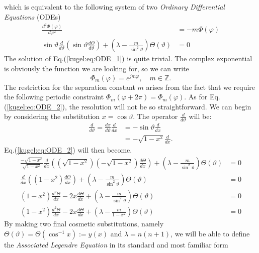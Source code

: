 which is equivalent to the following system of two \emph{Ordinary Differential Equations} (ODEs)
\begin{align}
    \frac{d^2\Phi(\varphi)}{d\varphi^2} &= -m \Phi(\varphi) \label{kugel:eq:ODE_1} \\ 
    \sin \vartheta \frac{d}{d \vartheta} \left( \sin \vartheta \frac{d \Theta}{d \vartheta} \right) + \left( \lambda - \frac{m}{\sin^2 \vartheta} \right)\Theta(\vartheta) &= 0 \label{kugel:eq:ODE_2} 
\end{align}
The solution of Eq.(\ref{kugel:eq:ODE_1}) is quite trivial. The complex exponential is obviously the function we are looking for, so we can write
\begin{equation*}
    \Phi_m(\varphi) = e^{j m \varphi}, \quad m \in \mathbb{Z}.
\end{equation*}
The restriction for the separation constant $m$ arises from the fact that we require the following periodic constraint $\Phi_m(\varphi + 2\pi) = \Phi_m(\varphi)$.\newline
As for Eq.(\ref{kugel:eq:ODE_2}), the resolution will not be so straightforward. We can begin by considering the substitution $x = \cos \vartheta$. The operator $\frac{d}{d \vartheta}$ will be:
\begin{align*}
    \frac{d}{d \vartheta} = \frac{dx}{d \vartheta}\frac{d}{dx} &= -\sin \vartheta \frac{d}{dx} \\
    &= -\sqrt{1-x^2} \frac{d}{dx}.
\end{align*} 
Eq.(\ref{kugel:eq:ODE_2}) will then become.
\begin{align*}
   \frac{-\sqrt{1-x^2}}{\sqrt{1-x^2}} \frac{d}{dx} \left( \left(\sqrt{1-x^2}\right) \left(-\sqrt{1-x^2}\right) \frac{d \Theta}{dx} \right) + \left( \lambda - \frac{m}{\sin^2 \vartheta} \right)\Theta(\vartheta) &= 0 \\
   \frac{d}{dx} \left( (1-x^2) \frac{d \Theta}{dx} \right) + \left( \lambda - \frac{m}{\sin^2 \vartheta} \right)\Theta(\vartheta) &= 0 \\
   (1-x^2)\frac{d^2 \Theta}{dx} - 2x\frac{d \Theta}{dx} + \left( \lambda - \frac{m}{\sin^2 \vartheta} \right)\Theta(\vartheta) &= 0 \\
   (1-x^2)\frac{d^2 \Theta}{dx} - 2x\frac{d \Theta}{dx} + \left( \lambda - \frac{m}{1-x^2} \right)\Theta(\vartheta) &= 0 
\end{align*}
By making two final cosmetic substitutions, namely $\Theta(\vartheta)=\Theta(\cos^{-1}x):=y(x)$ and $\lambda=n(n+1)$, we will be able to define the \emph{Associated Legendre Equation} in its standard and most familiar form
